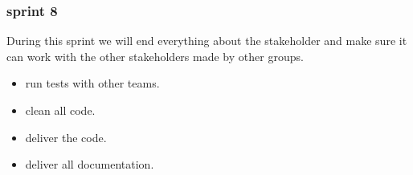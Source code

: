 \subsubsection{sprint 8}
During this sprint we will end everything about the stakeholder and make sure it can work with the other stakeholders made by other groups.
\begin{itemize}
	\item run tests with other teams.
	\item clean all code.
	\item deliver the code.
	\item deliver all documentation.
\end{itemize}
